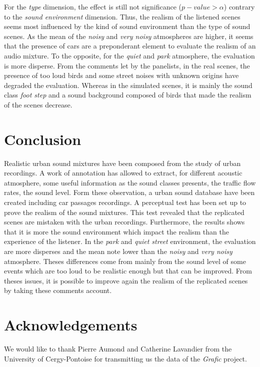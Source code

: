 \documentclass[a4,11pt,twocolumn]{article}
\begin{document}
For the \textit{type} dimension, the effect is still not significance ($p-value > \alpha$) contrary to the \textit{sound environment} dimension. Thus, the realism of the listened scenes seems most influenced by the kind of sound environment than the type of sound scenes. As the mean of the \textit{noisy} and \textit{very noisy} atmospheres are higher, it seems that the presence of cars are a preponderant element to evaluate the realism of an audio mixture. To the opposite, for the \textit{quiet} and \textit{park} atmosphere, the evaluation is more disperse. From the comments let by the panelists, in the real scenes, the presence of too loud birds and some street noises with unknown origins have degraded the evaluation. Whereas in the simulated scenes, it is mainly the sound class \textit{foot step} and a sound background composed of birds that made the realism of the scenes decrease. \\

\section*{Conclusion}
Realistic urban sound mixtures have been composed from the study of urban recordings. A work of annotation has allowed to extract, for different acoustic atmosphere, some useful information as the sound classes presents, the traffic flow rates, the sound level. Form these observation, a urban sound database have been created including car passages recordings. A perceptual test has been set up to prove the realism of the sound mixtures. This test revealed that the replicated scenes are mistaken with the urban recordings. Furthermore, the results shows that it is more the sound environment which impact the realism than the experience of the listener. In the \textit{park} and \textit{quiet street} environment, the evaluation are more disperses and the mean note lower than the \textit{noisy} and \textit{very noisy} atmosphere. Theses differences come from mainly from the sound level of some events which are too loud to be realistic enough but that can be improved. From theses issues, it is possible to improve again the realism  of the replicated scenes by taking these comments account.

\section*{Acknowledgements}
We would like to thank Pierre Aumond and Catherine Lavandier from the University of Cergy-Pontoise for transmitting us the data of the \textit{Grafic} project.



\end{document}
